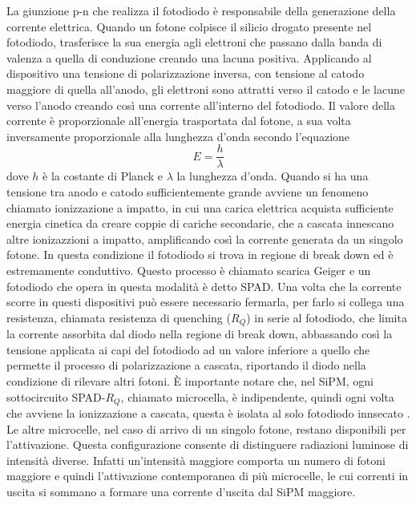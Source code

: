 La giunzione p-n che realizza il fotodiodo è responsabile della generazione della corrente elettrica. Quando un 
fotone colpisce il silicio drogato presente nel fotodiodo, trasferisce la sua energia agli elettroni che passano dalla banda di valenza 
a quella di conduzione creando una lacuna positiva. Applicando al dispositivo una tensione di polarizzazione inversa, con tensione
al catodo maggiore di quella all'anodo, gli elettroni sono attratti verso il catodo e le lacune verso l'anodo creando così una corrente
all'interno del fotodiodo. Il valore della corrente è proporzionale all'energia trasportata dal fotone, a sua volta inversamente 
proporzionale alla lunghezza d'onda secondo l'equazione
\begin{equation}
    E = \frac{h}{\lambda}
    \label{eq:energia_onde}
\end{equation}
dove $h$ è la costante di Planck e $\lambda$ la lunghezza d'onda. Quando si ha una tensione tra anodo e catodo sufficientemente grande
avviene un fenomeno chiamato ionizzazione a impatto, in cui una carica elettrica acquista sufficiente energia cinetica da creare coppie
di cariche secondarie, che a cascata innescano altre ionizazzioni a impatto, amplificando così la corrente generata da
un singolo fotone. In questa condizione il fotodiodo si trova in regione di break down ed è estremamente conduttivo. Questo processo è 
chiamato scarica Geiger e un fotodiodo che opera in questa modalità è detto SPAD. Una volta che la corrente 
scorre in questi dispositivi può essere necessario fermarla, per farlo si collega una resistenza, chiamata resistenza di quenching 
($R_Q$) in serie al fotodiodo, che limita la corrente assorbita dal diodo nella regione di break down, abbassando così la tensione applicata
ai capi del fotodiodo ad un valore inferiore a quello che permette il processo di polarizzazione a cascata, riportando il diodo nella
condizione di rilevare altri fotoni. È importante notare che, nel SiPM, ogni sottocircuito SPAD-$R_Q$, chiamato microcella, è indipendente, 
quindi ogni volta che avviene la ionizzazione a cascata, questa è isolata al solo fotodiodo innsecato \cite{semiconductorcomponentsindustriesllc2011_2023_and9770}. Le altre microcelle, nel caso di 
arrivo di un singolo fotone, restano disponibili per l'attivazione. Questa configurazione consente di distinguere radiazioni luminose di intensità 
diverse. Infatti un'intensità maggiore comporta un numero di fotoni maggiore e quindi l'attivazione contemporanea di più microcelle, le cui correnti 
in uscita si sommano a formare una corrente d'uscita dal SiPM maggiore.
